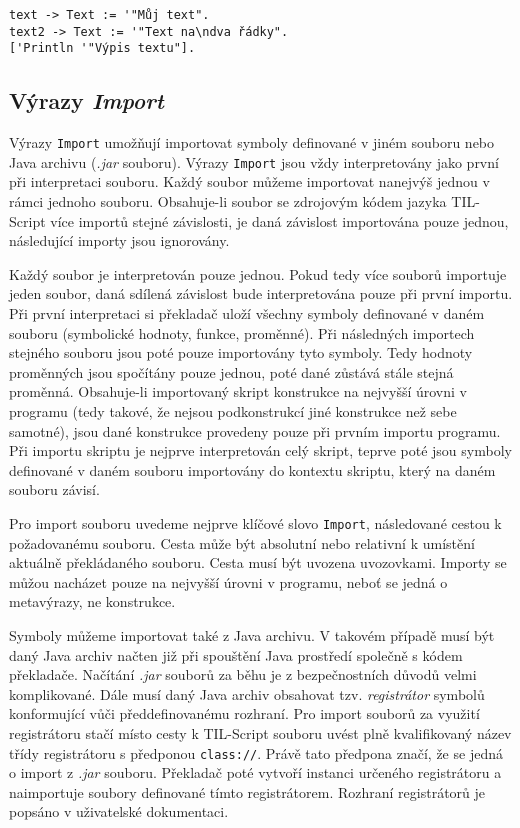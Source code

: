\begin{lstlisting}[caption={Příklad využití typu Text}]
text -> Text := '"Můj text".
text2 -> Text := '"Text na\ndva řádky".
['Println '"Výpis textu"].
\end{lstlisting}

\subsection{Výrazy \textit{Import}}\label{import-statement}

Výrazy \lstinline{Import} umožňují importovat symboly definované v jiném souboru nebo Java archivu
(\textit{.jar} souboru). Výrazy \lstinline{Import} jsou vždy interpretovány jako první při
interpretaci souboru. Každý soubor můžeme importovat nanejvýš jednou v rámci jednoho souboru.
Obsahuje-li soubor se zdrojovým kódem jazyka TIL-Script více importů stejné závislosti, je daná
závislost importována pouze jednou, následující importy jsou ignorovány.

Každý soubor je interpretován pouze jednou. Pokud tedy více souborů importuje jeden soubor, daná
sdílená závislost bude interpretována pouze při první importu. Při první interpretaci si překladač
uloží všechny symboly definované v daném souboru (symbolické hodnoty, funkce, proměnné).
Při následných importech stejného souboru jsou poté pouze importovány tyto symboly. Tedy hodnoty
proměnných jsou spočítány pouze jednou, poté dané zůstává stále stejná proměnná. Obsahuje-li
importovaný skript konstrukce na nejvyšší úrovni v programu (tedy takové, že nejsou podkonstrukcí
jiné konstrukce než sebe samotné), jsou dané konstrukce provedeny pouze při prvním importu
programu. Při importu skriptu je nejprve interpretován celý skript, teprve poté jsou symboly
definované v daném souboru importovány do kontextu skriptu, který na daném souboru závisí.

Pro import souboru uvedeme nejprve klíčové slovo \lstinline{Import}, následované cestou
k požadovanému souboru. Cesta může být absolutní nebo relativní k umístění aktuálně překládaného
souboru. Cesta musí být uvozena uvozovkami. Importy se můžou nacházet pouze na nejvyšší úrovni
v programu, neboť se jedná o metavýrazy, ne konstrukce.

Symboly můžeme importovat také z Java archivu. V takovém případě musí být daný Java archiv načten
již při spouštění Java prostředí společně s kódem překladače. Načítání \textit{.jar} souborů
za běhu je z bezpečnostních důvodů velmi komplikované. Dále musí daný Java archiv obsahovat tzv.
\textit{registrátor} symbolů konformující vůči předdefinovanému rozhraní. Pro import souborů
za využití registrátoru stačí místo cesty k TIL-Script souboru uvést plně kvalifikovaný název
třídy registrátoru s předponou \lstinline{class://}. Právě tato předpona značí, že se jedná o
import z \textit{.jar} souboru. Překladač poté vytvoří instanci určeného registrátoru a naimportuje
soubory definované tímto registrátorem. Rozhraní registrátorů je popsáno v uživatelské dokumentaci.

